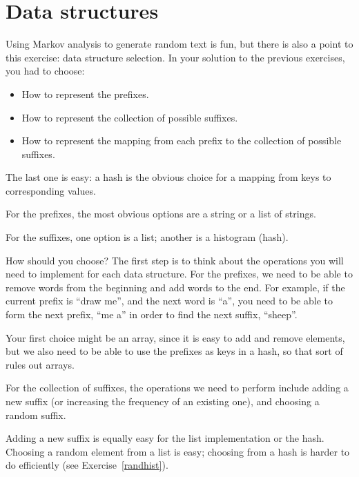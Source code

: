 \section{Data structures}

Using Markov analysis to generate random text is fun, but there is
also a point to this exercise: data structure selection.  In your
solution to the previous exercises, you had to choose:

\begin{itemize}

\item How to represent the prefixes.

\item How to represent the collection of possible suffixes.

\item How to represent the mapping from each prefix to
the collection of possible suffixes.

\end{itemize}

The last one is easy: a hash is the obvious choice
for a mapping from keys to corresponding values.

For the prefixes, the most obvious options are a string or
a list of strings.

For the suffixes,
one option is a list; another is a histogram (hash).

How should you choose?  The first step is to think about
the operations you will need to implement for each data structure.
For the prefixes, we need to be able to remove words from
the beginning and add words to the end.  For example, if the current
prefix is ``draw me'', and the next word is ``a'', you need
to be able to form the next prefix, ``me a'' in order to find 
the next suffix, ``sheep''.

Your first choice might be an array, since it is easy to add
and remove elements, but we also need to be able to use the
prefixes as keys in a hash, so that sort of rules out arrays.

For the collection of suffixes, the operations we need to
perform include adding a new suffix (or increasing the frequency
of an existing one), and choosing a random suffix.

Adding a new suffix is equally easy for the list implementation
or the hash.  Choosing a random element from a list
is easy; choosing from a hash is harder to do
efficiently (see Exercise~\ref{randhist}).


